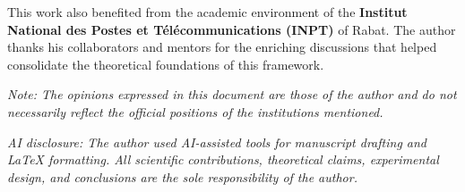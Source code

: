 \documentclass[letterpaper]{article}
\begin{document}
This work also benefited from the academic environment of the
\textbf{Institut National des Postes et T\'el\'ecommunications (INPT)}
of Rabat. The author thanks his collaborators and mentors for the
enriching discussions that helped consolidate the theoretical
foundations of this framework.

\textit{Note: The opinions expressed in this document are those of
the author and do not necessarily reflect the official positions of
the institutions mentioned.}

\medskip
\noindent\textit{AI disclosure: The author used AI-assisted tools 
for manuscript drafting and \LaTeX{} formatting. All scientific 
contributions, theoretical claims, experimental design, and 
conclusions are the sole responsibility of the author.}


\end{document}
